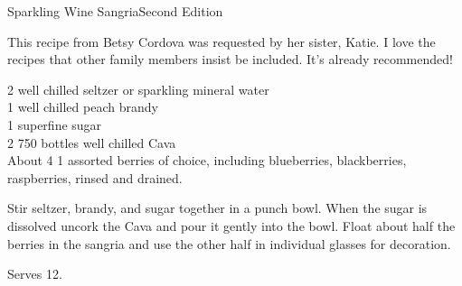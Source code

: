 \begin{entry}{Sparkling Wine Sangria}{Second Edition}

\begin{open}
  This recipe from Betsy Cordova was requested by her sister, Katie. I love the recipes that other family members insist be included. It's already recommended!
\end{open}
\begin{ingredients}
  \SI{2}{\cup} well chilled seltzer or sparkling mineral water \\
  \SI{1}{\cup} well chilled peach brandy \\
\SI{1}{\cup} superfine sugar \\
 2 \SI{750}{\mill} bottles well chilled Cava \\
 About 4 \SI{1}{\cup} assorted berries of choice, including blueberries, blackberries, raspberries, rinsed and drained. \\
\end{ingredients}
Stir seltzer, brandy, and sugar together in a punch bowl. When the sugar is dissolved uncork the Cava and pour it gently into the bowl. Float about half the berries in the sangria and use the other half in individual glasses for decoration.

Serves 12.
\end{entry}


